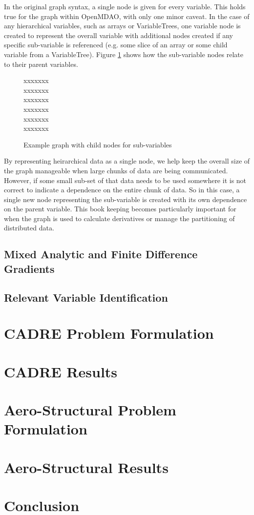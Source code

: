 \documentclass[]{aiaa-tc} %
\begin{document}
    In the original graph syntax, a single node is given for every variable. This holds true for the graph 
    within OpenMDAO, with only one minor caveat. In the case of any hierarchical variables, such as arrays
    or VariableTrees, one variable node is created to represent the overall variable with additional nodes
    created if any specific sub-variable is referenced (e.g. some slice of an array or some child variable from a 
    VariableTree). Figure \ref{fig:subvars} shows how the sub-variable nodes relate to their parent variables. 

     \begin{figure}[!htb]\begin{center}
      xxxxxxx\\xxxxxxx\\xxxxxxx\\xxxxxxx\\xxxxxxx\\xxxxxxx\\
      \caption{ Example graph with child nodes for sub-variables \label{fig:subvars}}
    \end{center}\end{figure}

    By representing heirarchical data as a single node, we help keep the overall size of the graph manageable 
    when large chunks of data are being communicated. However, if some small sub-set of that data needs to be 
    used somewhere it is not correct to indicate a dependence on the entire chunk of data. So in this case, a 
    single new node representing the sub-variable is created with its own dependence on the parent variable. 
    This book keeping becomes particularly important for when the graph is used to calculate derivatives or 
    manage the partitioning of distributed data. 

    


    \subsection{Mixed Analytic and Finite Difference Gradients}
    \subsection{Relevant Variable Identification}

  \section{CADRE Problem Formulation}

  \section{CADRE Results}

  \section{Aero-Structural Problem Formulation}

  \section{Aero-Structural Results}

  \section{Conclusion}
 
  
\end{document}
